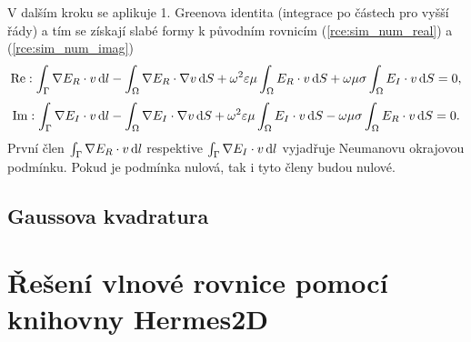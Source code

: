 V dalším kroku se aplikuje 1. Greenova identita \cite[příloha A.2]{num} (integrace po částech pro vyšší řády) a tím se získají slabé formy k původním rovnicím (\ref{rce:sim_num_real}) a (\ref{rce:sim_num_imag})
\begin{equation}
	\mathrm{Re} : \int_{\Gamma}\nabla E_R\cdot v\,\mathrm{d} l-\int_{\Omega}\nabla E_R\cdot\nabla v \,\mathrm{d} S + \omega^{2}\varepsilon\mu\int_{\Omega} E_R\cdot v\,\mathrm{d} S + \omega\mu\sigma\int_{\Omega} E_I\cdot v\,\mathrm{d} S = 0,
	\label{rce:sim_weak_real} 
\end{equation}
\begin{equation}
	\mathrm{Im} : \int_{\Gamma}\nabla E_I\cdot v\,\mathrm{d} l-\int_{\Omega}\nabla E_I\cdot\nabla v\,\mathrm{d} S + \omega^{2}\varepsilon\mu\int_{\Omega} E_I\cdot v\,\mathrm{d} S - \omega\mu\sigma\int_{\Omega} E_R\cdot v\,\mathrm{d} S = 0.
	\label{rce:sim_weak_imag} 
\end{equation}
První člen $\int_{\Gamma}\nabla E_R\cdot v\,\mathrm{d} l$ respektive $\int_{\Gamma}\nabla E_I\cdot v\,\mathrm{d} l$ vyjadřuje Neumanovu okrajovou podmínku. Pokud je podmínka nulová, tak i tyto členy budou nulové.

\subsection{Gaussova kvadratura}

\section{Řešení vlnové rovnice pomocí knihovny Hermes2D}



